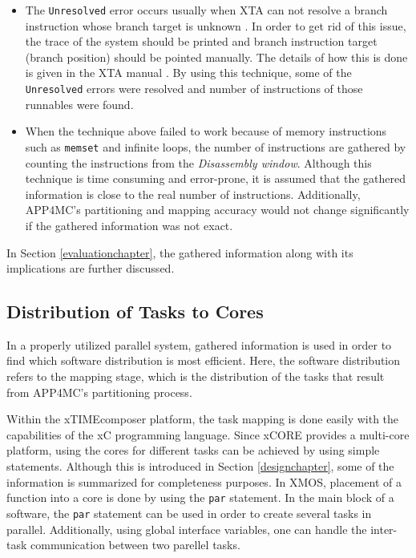 \begin{itemize}
	\item The \texttt{Unresolved} error occurs usually when XTA can not resolve a branch instruction whose branch target is unknown \cite{xtamanual}. In order to get rid of this issue, the trace of the system should be printed and branch instruction target (branch position) should be pointed manually. The details of how this is done is given in the XTA manual \cite{xtamanual}. By using this technique, some of the \texttt{Unresolved} errors were resolved and number of instructions of those runnables were found.

	\item When the technique above failed to work because of memory instructions such as \texttt{memset} and infinite loops, the number of instructions are gathered by counting the instructions from the \textit{Disassembly window}. Although this technique is time consuming and error-prone, it is assumed that the gathered information is close to the real number of instructions. Additionally, APP4MC's partitioning and mapping accuracy would not change significantly if the gathered information was not exact. 
\end{itemize}

In Section \ref{evaluationchapter}, the gathered information along with its implications are further discussed.

\subsection{Distribution of Tasks to Cores}
In a properly utilized parallel system, gathered information is used in order to find which software distribution is most efficient. Here, the software distribution refers to the mapping stage, which is the distribution of the tasks that result from APP4MC's partitioning process.

Within the xTIMEcomposer platform, the task mapping is done easily with the capabilities of the xC programming language. Since xCORE provides a multi-core platform, using the cores for different tasks can be achieved by using simple statements. Although this is introduced in Section \ref{designchapter}, some of the information is summarized for completeness purposes. In XMOS, placement of a function into a core is done by using the \texttt{par} statement. In the main block of a software, the \texttt{par} statement can be used in order to create several tasks in parallel. Additionally, using global interface variables, one can handle the inter-task communication between two parellel tasks.

